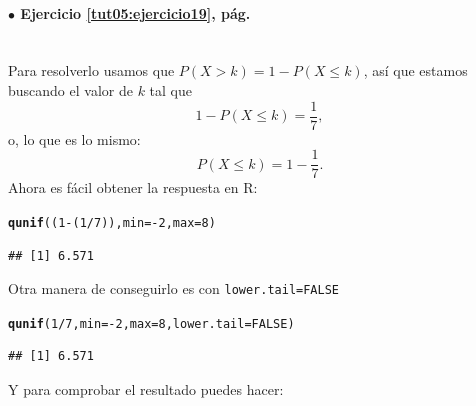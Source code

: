 \documentclass[10pt,a4paper]{article}\usepackage[]{graphicx}\usepackage[]{color}
\makeatletter
\newcommand{\hlnum}[1]{\textcolor[rgb]{0.686,0.059,0.569}{#1}}%
\newcommand{\hlopt}[1]{\textcolor[rgb]{0,0,0}{#1}}%
\newcommand{\hlstd}[1]{\textcolor[rgb]{0.345,0.345,0.345}{#1}}%
\newcommand{\hlkwc}[1]{\textcolor[rgb]{0.333,0.667,0.333}{#1}}%
\newcommand{\hlkwd}[1]{\textcolor[rgb]{0.737,0.353,0.396}{\textbf{#1}}}%
\newenvironment{kframe}{%
 \def\at@end@of@kframe{}%
 \ifinner\ifhmode%
  \def\at@end@of@kframe{\end{minipage}}%
  \begin{minipage}{\columnwidth}%
 \fi\fi%
 \def\FrameCommand##1{\hskip\@totalleftmargin \hskip-\fboxsep
 \colorbox{shadecolor}{##1}\hskip-\fboxsep
     \hskip-\linewidth \hskip-\@totalleftmargin \hskip\columnwidth}%
 \MakeFramed {\advance\hsize-\width
   \@totalleftmargin\z@ \linewidth\hsize
   \@setminipage}}%
 {\par\unskip\endMakeFramed%
 \at@end@of@kframe}
\newenvironment{knitrout}{}{} %
\makeatother
\begin{document}
\paragraph{\bf $\bullet$ Ejercicio \ref{tut05:ejercicio19}, pág. \pageref{tut05:ejercicio19}}
\label{tut05:ejercicio19:sol}\quad\\

Para resolverlo usamos que $P(X > k)= 1 - P(X \leq k)$, así que estamos buscando el valor de $k$ tal que
\[1 - P(X \leq k) = \dfrac{1}{7},\]
o, lo que es lo mismo:
\[P(X \leq k) = 1 - \dfrac{1}{7}.\]
Ahora es fácil obtener la respuesta en R:
\begin{knitrout}
\color{fgcolor}\begin{kframe}
\begin{alltt}
\hlkwd{qunif}\hlstd{((}\hlnum{1} \hlopt{-} \hlstd{(}\hlnum{1}\hlopt{/}\hlnum{7}\hlstd{)),} \hlkwc{min}\hlstd{=}\hlopt{-}\hlnum{2}\hlstd{,} \hlkwc{max}\hlstd{=}\hlnum{8}\hlstd{)}
\end{alltt}
\begin{verbatim}
## [1] 6.571
\end{verbatim}
\end{kframe}
\end{knitrout}
Otra manera de conseguirlo es con {\tt lower.tail=FALSE}
\begin{knitrout}
\color{fgcolor}\begin{kframe}
\begin{alltt}
\hlkwd{qunif}\hlstd{(}\hlnum{1}\hlopt{/}\hlnum{7}\hlstd{,} \hlkwc{min}\hlstd{=}\hlopt{-}\hlnum{2}\hlstd{,} \hlkwc{max}\hlstd{=}\hlnum{8}\hlstd{,} \hlkwc{lower.tail}\hlstd{=}\hlnum{FALSE}\hlstd{)}
\end{alltt}
\begin{verbatim}
## [1] 6.571
\end{verbatim}
\end{kframe}
\end{knitrout}
Y para comprobar el resultado puedes hacer:
\end{document}
